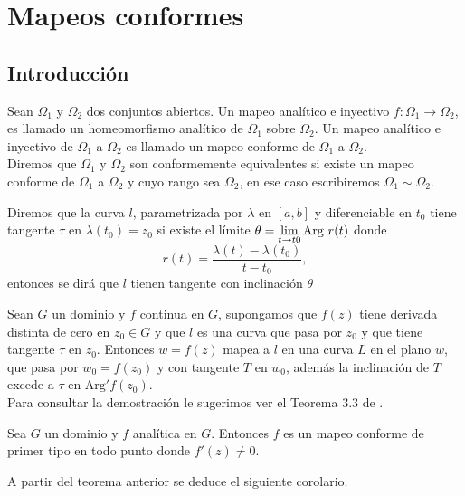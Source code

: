 \chapter{Mapeos conformes} \label{chap:background}
\section{Introducción}\label{introcap2}
\begin{defi}
	Sean $\Omega_{1}$ y $\Omega_{2}$ dos conjuntos abiertos. Un mapeo analítico e inyectivo $f:\Omega_{1}\rightarrow\Omega_{2}$, es llamado un homeomorfismo analítico de  $\Omega_{1}$ sobre $\Omega_{2}$. Un mapeo analítico e inyectivo de $\Omega_{1}$ a $\Omega_{2}$ es llamado un mapeo conforme de $\Omega_{1}$ a $\Omega_{2}$.\\
	Diremos que $\Omega_{1}$ y $\Omega_{2}$ son conformemente equivalentes si existe un mapeo conforme de $\Omega_{1}$ a $\Omega_{2}$ y cuyo rango sea $\Omega_{2}$, en ese caso escribiremos $\Omega_{1} \sim\Omega_{2}$.
\end{defi}
\begin{defi}
	Diremos que la curva $l$, parametrizada por $\lambda$ en $[a,b]$ y diferenciable en $t_0$ tiene tangente $\tau$ en $\lambda(t_0) = z_0$ si existe el límite $\theta = \displaystyle\lim_{t\rightarrow t0}\mbox{Arg }r(t)$  donde
	$$r(t)=\dfrac{\lambda(t)-\lambda(t_0)}{t-t_0},$$ entonces se dirá que $l$ tienen tangente con inclinación $\theta$
\end{defi}

\begin{teor}
	Sean $G$ un dominio y $f$ continua en $G$, supongamos que $f(z)$ tiene derivada
	distinta de cero en $z_0 \in G$ y que $l$ es una curva que pasa por $z_0$ y que tiene tangente $\tau$ en
	$z_0$. Entonces $w = f(z)$ mapea a $l$ en una curva $L$ en el plano $w$, que pasa por $w_0 = f(z_0)$ y con
	tangente $T$ en $w_0$, además la inclinación de $T$ excede a $\tau$ en $\mbox{Arg}'f(z_0)$.\\
	Para consultar la demostración le sugerimos ver el Teorema 3.3 de \cite{silverman}.
\end{teor}

\begin{teor}
	Sea $G$ un dominio y $f$ analítica en $G$. Entonces $f$ es un mapeo conforme de primer
	tipo en todo punto donde $f'(z) \neq 0$.
\end{teor}

\noindent A partir del teorema anterior se deduce el siguiente corolario.

